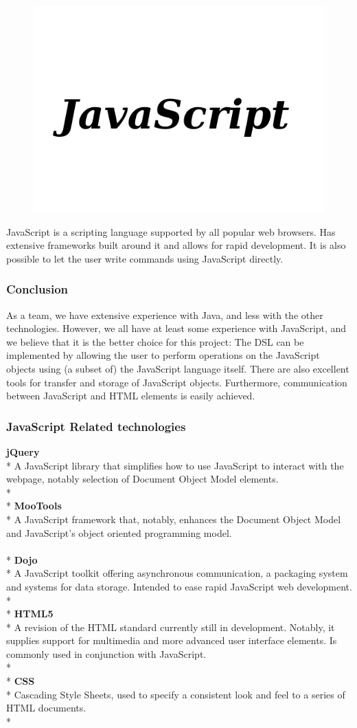 \begin{figure}
\vspace{-20pt}
\centering
\includegraphics[width=.14\textwidth]{image/javascript-logo.png}
\end{figure}


JavaScript is a scripting language supported by all popular web browsers. Has extensive frameworks built around it and allows for rapid development. It is also possible to let the user write commands using JavaScript directly.

\subsubsection{Conclusion}
As a team, we have extensive experience with Java, and less with the other technologies. However, we all have at least some experience with JavaScript, and we believe that it is the better choice for this project: The DSL can be implemented by allowing the user to perform operations on the JavaScript objects using (a subset of) the JavaScript language itself. There are also excellent tools for transfer and storage of JavaScript objects. Furthermore, communication between JavaScript and HTML elements is easily achieved.

\subsubsection{JavaScript Related technologies}

\textbf{jQuery}\\*
A JavaScript library that simplifies how to use JavaScript to interact with the webpage, notably selection of Document Object Model elements.\\*
\\*
\textbf{MooTools}\\*
A JavaScript framework that, notably, enhances the Document Object Model and JavaScript's object oriented programming model.\\
\\*
\textbf{Dojo}\\*
A JavaScript toolkit offering asynchronous communication, a packaging system and systems for data storage. Intended to ease rapid JavaScript web development.\\*
\\*
\textbf{HTML5}\\*
A revision of the HTML standard currently still in development. Notably, it supplies support for multimedia and more advanced user interface elements. Is commonly used in conjunction with JavaScript.\\*
\\*
\textbf{CSS}\\*
Cascading Style Sheets, used to specify a consistent look and feel to a series of HTML documents.\\*


